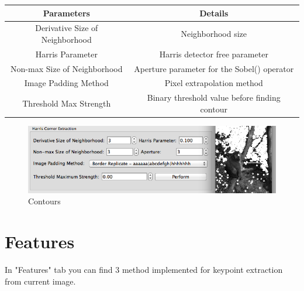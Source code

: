 \documentclass{article}
\begin{document}
\begin{table}[H]
\begin{center}
\begin{tabular}{|c|c|l|l|l|}
\hline
\textbf{Parameters}             & \multicolumn{4}{|c|}{\textbf{Details}}                              \\ \hline
Derivative Size of Neighborhood & \multicolumn{4}{|c|}{Neighborhood size}                             \\ \hline
Harris Parameter                & \multicolumn{4}{|c|}{Harris detector free parameter}                \\ \hline
Non-max Size of Neighborhood    & \multicolumn{4}{|c|}{Aperture parameter for the Sobel() operator}   \\ \hline
Image Padding Method            & \multicolumn{4}{|c|}{Pixel extrapolation method}                    \\ \hline
Threshold Max Strength          & \multicolumn{4}{|c|}{Binary threshold value before finding contour} \\ \hline
\end{tabular}
\end{center}
\end{table}

\begin{figure}[H]
\begin{center}
\includegraphics[scale=0.5]{toolboxHarris.png}
\caption{Contours}
\end{center}
\end{figure}	           

\section{Features}
In "Features" tab you can find 3 method implemented for keypoint extraction from current image.
\end{document}
